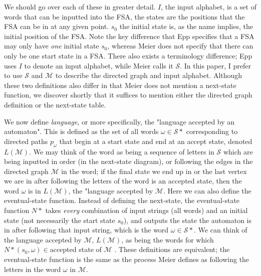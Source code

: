 \documentclass[12pt]{amsart}
\begin{document}
We should go over each of these in greater detail. $I$, the input alphabet, is a set of words that can be inputted into the FSA, the states are the positions that the FSA can be in at any given point. $s_0$ the initial state is, as the name implies, the initial position of the FSA. Note the key difference that Epp specifies that a FSA may only have \emph{one} initial state $s_0$, whereas Meier does not specify that there can only be one start state in a FSA. There also exists a terminology difference; Epp uses $I$ to denote an input alphabet, while Meier calls it $\mathcal{S}$. In this paper, I prefer to use $\mathcal{S}$ and $\mathcal{M}$ to describe the directed graph and input alphabet. Although these two definitions also differ in that Meier does not mention a next-state function, we discover shortly that it suffices to mention either the directed graph definition or the next-state table. 

We now define \emph{language}, or more specifically, the "language accepted by an automaton\cite{ggt}". This is defined as the set of all words $\omega \in \mathcal{S}*$ corresponding to directed paths $p_\omega$ that begin at a start state and end at an accept state, denoted $L(\mathcal{M})$\cite{ggt}. We may think of the word as being a sequence of letters in $\mathcal{S}$ which are being inputted in order (in the next-state diagram), or following the edges in the directed graph $\mathcal{M}$ in the word; if the final state we end up in or the last vertex we are in after following the letters of the word is an accepted state, then the word $\omega$ is in $L(\mathcal{M})$, the "language accepted by $\mathcal{M}$. Here we can also define the eventual-state function. Instead of defining the next-state, the eventual-state function $N*$ takes \emph{every} combination of input strings (all words) and an initial state (not necessarily the start state $s_0$), and outputs the state the automaton is in after following that input string, which is the word $\omega \in \mathcal{S}*$. We can think of the language accepted by $\mathcal{M}$, $L(\mathcal{M})$, as being the words for which $N*(s_0,\omega)\in $accepted state of $\mathcal{M}$ \cite{epp}. These definitions are equivalent; the eventual-state function is the same as the process Meier defines as following the letters in the word $\omega$ in $\mathcal{M}$.
\end{document}

